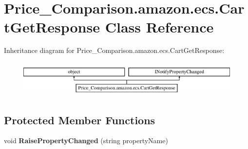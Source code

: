 \hypertarget{class_price___comparison_1_1amazon_1_1ecs_1_1_cart_get_response}{\section{Price\-\_\-\-Comparison.\-amazon.\-ecs.\-Cart\-Get\-Response Class Reference}
\label{class_price___comparison_1_1amazon_1_1ecs_1_1_cart_get_response}
}


 


Inheritance diagram for Price\-\_\-\-Comparison.\-amazon.\-ecs.\-Cart\-Get\-Response\-:\begin{figure}[H]
\begin{center}
\leavevmode
\includegraphics[height=1.885522cm]{class_price___comparison_1_1amazon_1_1ecs_1_1_cart_get_response}
\end{center}
\end{figure}
\subsection*{Protected Member Functions}
\begin{DoxyCompactItemize}
\item 
\hypertarget{class_price___comparison_1_1amazon_1_1ecs_1_1_cart_get_response_ac4263bc711630c2009bf3c1446837d25}{void {\bfseries Raise\-Property\-Changed} (string property\-Name)}\label{class_price___comparison_1_1amazon_1_1ecs_1_1_cart_get_response_ac4263bc711630c2009bf3c1446837d25}

\end{DoxyCompactItemize}
